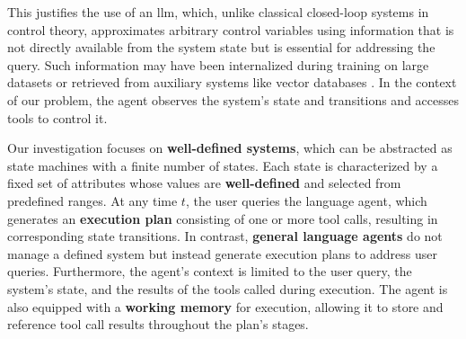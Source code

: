 \pskip



\pskip

This justifies the use of an \gls{llm}, which, unlike classical closed-loop systems in control theory, approximates arbitrary control variables using information that is not directly available from the system state but is essential for addressing the query. Such information may have been internalized during training on large datasets or retrieved from auxiliary systems like vector databases \cite{tonmoy2024comprehensive}\cite{zhang2023retrieve}. In the context of our problem, the agent observes the system's state and transitions and accesses tools to control it.

\pskip

Our investigation focuses on \textbf{well-defined systems}, which can be abstracted as state machines with a finite number of states. Each state is characterized by a fixed set of attributes whose values are \textbf{well-defined} and selected from predefined ranges. At any time $t$, the user queries the language agent, which generates an \textbf{execution plan} consisting of one or more tool calls, resulting in corresponding state transitions. In contrast, \textbf{general language agents} do not manage a defined system but instead generate execution plans to address user queries. Furthermore, the agent's context is limited to the user query, the system’s state, and the results of the tools called during execution. The agent is also equipped with a \textbf{working memory} for execution, allowing it to store and reference tool call results throughout the plan's stages.